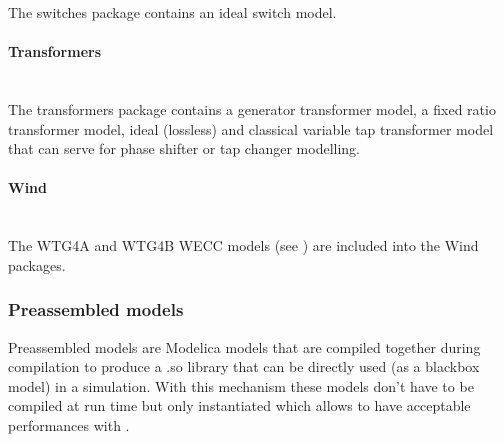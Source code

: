 \documentclass[a4paper, 12pt]{report}
\begin{document}
The switches package contains an ideal switch model.

\paragraph{Transformers}
~~\\

The transformers package contains a generator transformer model, a fixed ratio transformer model, ideal (lossless) and classical variable tap transformer model that can serve for phase shifter or tap changer modelling.

\paragraph{Wind}
~~\\

The WTG4A and WTG4B \ac{WECC} models (see \cite{WECC}) are included into the Wind packages.

\subsubsection{Preassembled models}

Preassembled models are Modelica models that are compiled together during \Dynawo compilation to produce a .so library that can be directly used (as a blackbox model) in a simulation. With this mechanism these models don't have to be compiled at run time but only instantiated which allows to have acceptable performances with \Dynawo. \\
\end{document}
